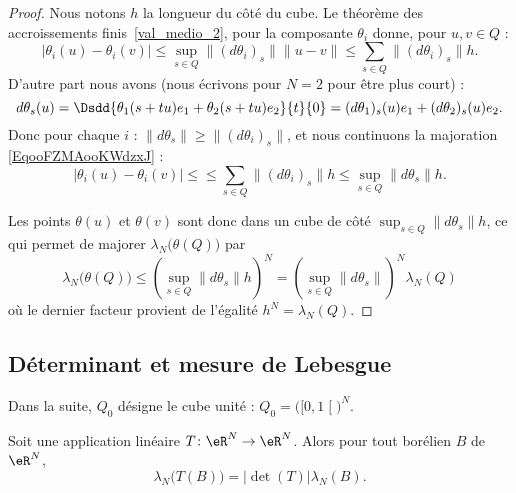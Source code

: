\begin{proof}
    Nous notons \( h\) la longueur du côté du cube. Le théorème des accroissements finis~\ref{val_medio_2}, pour la composante \( \theta_i\) donne, pour \( u,v\in Q\) :
    \begin{equation}        \label{EqooFZMAooKWdzxJ}
        \big|  \theta_i(u)-\theta_i(v) \big|\leq\sup_{s\in Q}\| (d\theta_i)_s \|\| u-v \|\leq \sum_{s\in Q}\| (d\theta_i)_s \|h.
    \end{equation}
    D'autre part nous avons (nous écrivons pour \( N=2\) pour être plus court) :
    \begin{equation}
        d\theta_s(u)=\Dsdd{ \theta_1(s+tu)e_1+\theta_2(s+tu)e_2 }{t}{0}=(d\theta_1)_s(u)e_1+(d\theta_2)_s(u)e_2.
    \end{equation}
    Donc pour chaque \( i\) : \( \| d\theta_s \|\geq \| (d\theta_i)_s \|\), et nous continuons la majoration \eqref{EqooFZMAooKWdzxJ} :
    \begin{equation}
        \big|  \theta_i(u)-\theta_i(v) \big|\leq\leq \sum_{s\in Q}\| (d\theta_i)_s \|h\leq \sup_{s\in Q}\| d\theta_s \|h.
    \end{equation}

    Les points \( \theta(u)\) et \( \theta(v)\) sont donc dans un cube de côté \( \sup_{s\in Q}\| d\theta_s \|h\), ce qui permet de majorer \( \lambda_N\big( \theta(Q) \big)\) par
    \begin{equation}
        \lambda_N\big( \theta(Q) \big)\leq \left( \sup_{s\in Q}\| d\theta_s \|h \right)^N=\left( \sup_{s\in Q}\| d\theta_s \| \right)^N\lambda_N(Q)
    \end{equation}
    où le dernier facteur provient de l'égalité \( h^N=\lambda_N(Q)\).
\end{proof}

\subsection{Déterminant et mesure de Lebesgue}

Dans la suite, \( Q_0\) désigne le cube unité : \( Q_0=\big( \mathopen[ 0 , 1 \mathclose[ \big)^N\).

\begin{theorem}    \label{ThoBVIJooMkifod}
    Soit une application linéaire \( T\colon \eR^N\to \eR^N\). Alors pour tout borélien \( B\) de \( \eR^N\),
    \begin{equation}
        \lambda_N\big( T(B) \big)=| \det(T) |\lambda_N(B).
    \end{equation}
\end{theorem}

